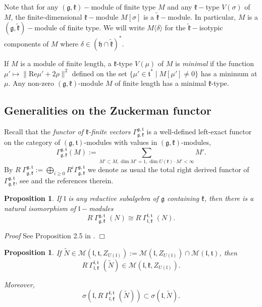 \documentclass[10pt]{amsart}
\newtheorem{prop}[theo]{Proposition}
\renewenvironment{proof}{ \emph{Proof}}{$\Box$}
\renewcommand{\gg}{\mathfrak{g}}
\newcommand{\hh}{\mathfrak{h}}
\newcommand{\kk}{\mathfrak{k}}
\renewcommand{\ll}{\mathfrak{l}}
\renewcommand{\tt}{\mathfrak{t}}
\begin{document}
Note that for any $(\gg,\kk)-$module of finite type $M$ and any $\kk-$type $V(\sigma)$ of $M$, the finite-dimensional $\kk-$module $M[\sigma]$ is a $\tilde{\kk}-$module. In particular, $M$ is a $(\gg,\tilde{\kk})-$module of finite type. We will write $M \langle\delta\rangle$ for the $\tilde{\kk}-$isotypic components of $M$ where $\delta \in (\hh \cap \tilde{\kk})^*$.

If $M$ is a module of finite length, a $\kk$-type $V(\mu)$ of $M$ is \textit{minimal} if the function $\mu '\mapsto \parallel\mathrm{Re}\mu '+2\rho \parallel^2 $ defined on the set $\{\mu '\in\tt^*\; |\; M[\mu ']\neq 0\}$ has a minimum at $\mu$. Any non-zero $(\gg,\kk)$-module $M$ of finite length has a minimal $\kk$-type.
 
\subsection{Generalities on the Zuckerman functor}\label{sect:1.4}

Recall that the \textit{functor of $\kk$-finite vectors} $\Gamma_{\gg,\kk}^{\gg,\tt}$ is a well-defined left-exact functor on the category of $(\gg,\tt)$-modules with values in $(\gg,\kk)$-modules, $$\Gamma_{\gg,\kk}^{\gg,\tt}(M):=\sum_{M'\subset M, \dim M'=1, \dim U(\kk)\cdot M'<\infty}M'.$$ By $R^\cdot\Gamma_{\gg,\kk}^{\gg,\tt}:=\bigoplus_{i\geq 0}R^i\Gamma_{\gg,\kk}^{\gg,\tt}$ we denote as usual the total right derived functor of $\Gamma_{\gg,\kk}^{\gg,\tt}$, see \cite{Z} and the references therein.

\begin{prop}\label{prop:2}
If $\ll$ is any reductive subalgebra of $\gg$ containing $\kk$, then there is a natural isomorphism of $\ll-$modules 
\begin{equation}\label{iso_1}
R^{\cdot}\Gamma_{\gg,\kk}^{\gg,\tt}\,\,(N) \cong R^{\cdot}\Gamma_{\ll,\kk}^{\ll,\tt}\,\,(N).
\end{equation} 
\end{prop}

\begin{proof}
 See Proposition 2.5 in \cite{PZ4}.
\end{proof}

\begin{prop}\label{prop:3}
 If $\tilde{N} \in \mathcal{M}(\ll,\tt,Z_{U(\ll)}):=\mathcal{M}(\ll,Z_{U(\ll)}) \cap \mathcal{M}(\ll,\tt)$, then $$R^{\cdot}\Gamma_{\ll,\kk}^{\ll,\tt}\,\,(\tilde{N}) \in \mathcal{M}(\ll,\kk,Z_{U(\ll)}).$$

 Moreover, $$\sigma(\ll,R^{\cdot}\Gamma_{\ll,\kk}^{\ll,\tt}\,\,(\tilde{N})) \subset \sigma(\ll,\tilde{N}).$$
\end{prop}
\end{document}
